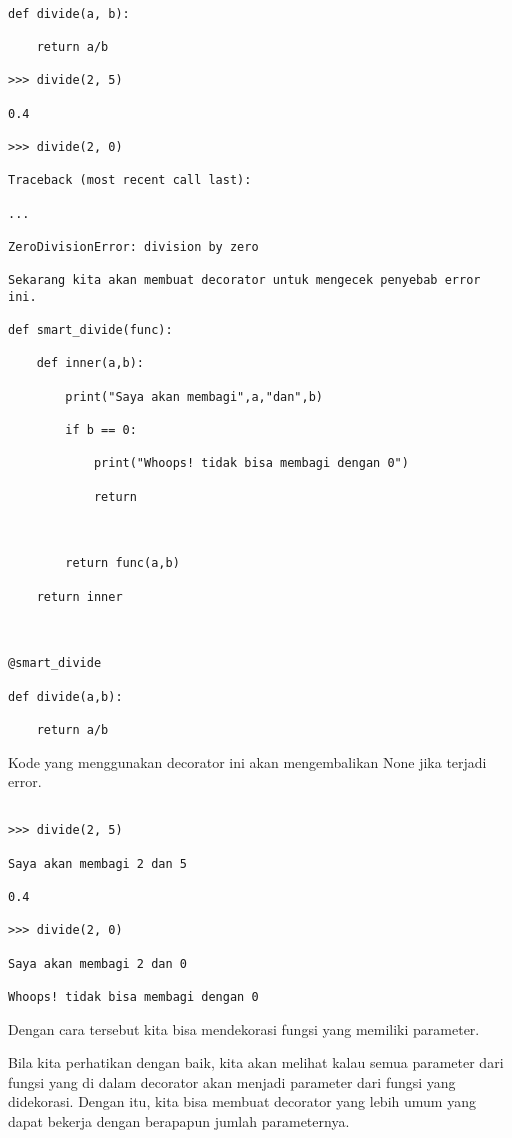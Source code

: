 \begin{verbatim}

def divide(a, b):

    return a/b

>>> divide(2, 5)

0.4

>>> divide(2, 0)

Traceback (most recent call last):

...

ZeroDivisionError: division by zero

Sekarang kita akan membuat decorator untuk mengecek penyebab error ini.

def smart_divide(func):

    def inner(a,b):

        print("Saya akan membagi",a,"dan",b)

        if b == 0:

            print("Whoops! tidak bisa membagi dengan 0")

            return



        return func(a,b)

    return inner



@smart_divide

def divide(a,b):

    return a/b

\end{verbatim}



Kode yang menggunakan decorator ini akan mengembalikan None jika terjadi error.

\begin{verbatim}

>>> divide(2, 5)

Saya akan membagi 2 dan 5

0.4

>>> divide(2, 0)

Saya akan membagi 2 dan 0

Whoops! tidak bisa membagi dengan 0

\end{verbatim}



Dengan cara tersebut kita bisa mendekorasi fungsi yang memiliki parameter.

Bila kita perhatikan dengan baik, kita akan melihat kalau semua parameter dari fungsi yang di dalam decorator akan menjadi parameter dari fungsi yang didekorasi. Dengan itu, kita bisa membuat decorator yang lebih umum yang dapat bekerja dengan berapapun jumlah parameternya.



